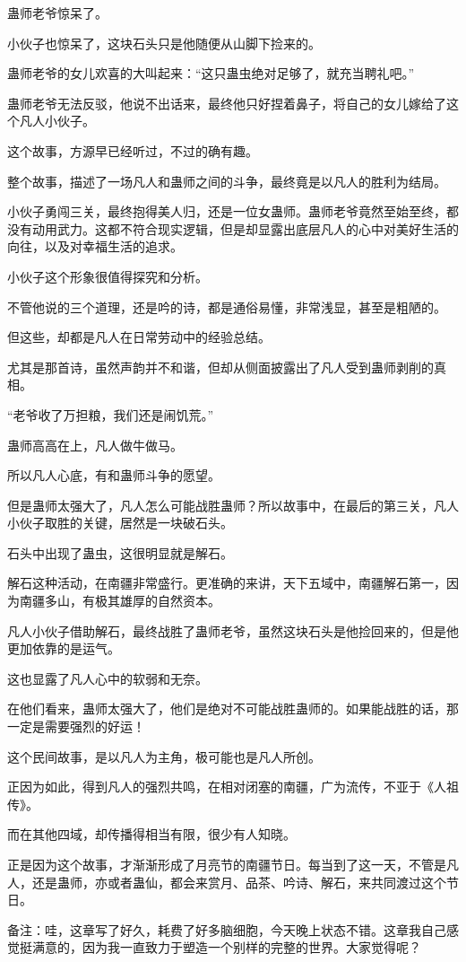 \begin{this_body}
蛊师老爷惊呆了。

小伙子也惊呆了，这块石头只是他随便从山脚下捡来的。

蛊师老爷的女儿欢喜的大叫起来：“这只蛊虫绝对足够了，就充当聘礼吧。”

蛊师老爷无法反驳，他说不出话来，最终他只好捏着鼻子，将自己的女儿嫁给了这个凡人小伙子。

这个故事，方源早已经听过，不过的确有趣。

整个故事，描述了一场凡人和蛊师之间的斗争，最终竟是以凡人的胜利为结局。

小伙子勇闯三关，最终抱得美人归，还是一位女蛊师。蛊师老爷竟然至始至终，都没有动用武力。这都不符合现实逻辑，但是却显露出底层凡人的心中对美好生活的向往，以及对幸福生活的追求。

小伙子这个形象很值得探究和分析。

不管他说的三个道理，还是吟的诗，都是通俗易懂，非常浅显，甚至是粗陋的。

但这些，却都是凡人在日常劳动中的经验总结。

尤其是那首诗，虽然声韵并不和谐，但却从侧面披露出了凡人受到蛊师剥削的真相。

“老爷收了万担粮，我们还是闹饥荒。”

蛊师高高在上，凡人做牛做马。

所以凡人心底，有和蛊师斗争的愿望。

但是蛊师太强大了，凡人怎么可能战胜蛊师？所以故事中，在最后的第三关，凡人小伙子取胜的关键，居然是一块破石头。

石头中出现了蛊虫，这很明显就是解石。

解石这种活动，在南疆非常盛行。更准确的来讲，天下五域中，南疆解石第一，因为南疆多山，有极其雄厚的自然资本。

凡人小伙子借助解石，最终战胜了蛊师老爷，虽然这块石头是他捡回来的，但是他更加依靠的是运气。

这也显露了凡人心中的软弱和无奈。

在他们看来，蛊师太强大了，他们是绝对不可能战胜蛊师的。如果能战胜的话，那一定是需要强烈的好运！

这个民间故事，是以凡人为主角，极可能也是凡人所创。

正因为如此，得到凡人的强烈共鸣，在相对闭塞的南疆，广为流传，不亚于《人祖传》。

而在其他四域，却传播得相当有限，很少有人知晓。

正是因为这个故事，才渐渐形成了月亮节的南疆节日。每当到了这一天，不管是凡人，还是蛊师，亦或者蛊仙，都会来赏月、品茶、吟诗、解石，来共同渡过这个节日。

备注：哇，这章写了好久，耗费了好多脑细胞，今天晚上状态不错。这章我自己感觉挺满意的，因为我一直致力于塑造一个别样的完整的世界。大家觉得呢？

\end{this_body}


